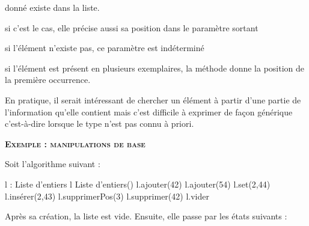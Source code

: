 \begin{liste}
		donné existe dans la liste. 
		\begin{liste}
			\item 
				si c’est le cas, elle précise aussi sa position dans le paramètre sortant 
			\item 
				si l’élément n’existe pas, ce paramètre est	indéterminé 
			\item 
				si l’élément est présent en plusieurs exemplaires, la méthode donne la
				position de la première occurrence.
		\end{liste}
	\item 
		En pratique, il serait intéressant de chercher un élément à partir d’une
		partie de l’information qu’elle contient mais c’est difficile à
		exprimer de façon générique c'est-à-dire lorsque le
		type n'est pas connu à priori.
\end{liste}

{\sffamily\bfseries\scshape
Exemple : manipulations de base}

Soit l'algorithme suivant :

\begin{Pseudocode}
		\Decl l : Liste d'entiers
		\Let l \Gets {} Liste d'entiers()
		\Stmt l.ajouter(42)
		\Stmt l.ajouter(54)
		\Stmt l.set(2,44)
		\Stmt l.insérer(2,43)
		\Stmt l.supprimerPos(3)
		\Stmt l.supprimer(42)
		\Stmt l.vider
	\EndModule
\end{Pseudocode}

Après sa création, la liste est vide.
Ensuite, elle passe par les états suivants :

